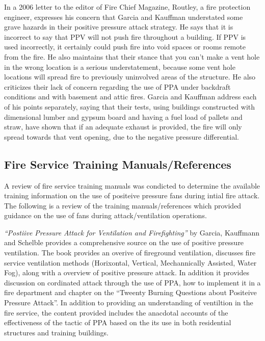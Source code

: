 \documentclass{article}
\begin{document}
In a 2006 letter to the editor of Fire Chief Magazine, Routley, a fire protection engineer, expresses his concern that Garcia and Kauffman understated some grave hazards in their positive pressure attack strategy. He says that it is incorrect to say that PPV will not push fire throughout a building. If PPV is used incorrectly, it certainly could push fire into void spaces or rooms remote from the fire. He also maintains that their stance that you can’t make a vent hole in the wrong location is a serious understatement, because some vent hole locations will spread fire to previously uninvolved areas of the structure. He also criticizes their lack of concern regarding the use of PPA under backdraft conditions and with basement and attic fires. Garcia and Kauffman address each of his points separately, saying that their tests, using buildings constructed with dimensional lumber and gypsum board and having a fuel load of pallets and straw, have shown that if an adequate exhaust is provided, the fire will only spread towards that vent opening, due to the negative pressure differential. \cite{PositiveOversight}

\subsection{Fire Service Training Manuals/References}
A review of fire service training manuals was condicted to determine the available training information on the use of positeive pressure fans during intial fire attack. The following is a review of the training manuals/references which provided guidance on the use of fans during attack/ventilation operations. 

\textit{``Postiive Pressure Attack for Ventilation and Firefighting''} by Garcia, Kauffmann and Schelble provides a comprehensive source on the use of positive pressure ventilation. The book provides an overive of fireground ventilation, discusses fire service ventilation methods (Horixontal, Vertical, Mechannically Assisted, Water Fog), along with a overview of positive pressure attack. In addition it provides discussion on cordinated attack through the use of PPA, how to implement it in a fire department and chapter on the ``Tweenty Burning Questions about Positeive Pressure Attack''. In addition to providing an understanding of ventiltion in the fire service, the content provided includes the anacdotal accounts of the effectiveness of the tactic of PPA based on the its use in both residential structures and training buildings. \cite{PPA_Garcia}
\end{document}
